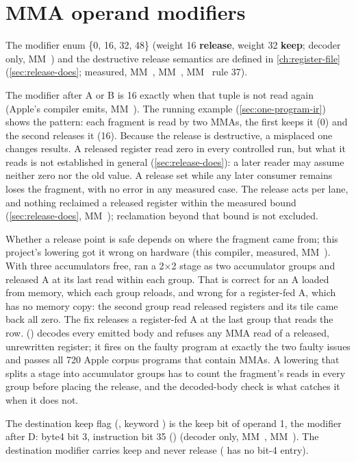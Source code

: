 \section{MMA operand modifiers}\label{sec:modifiers-keep-flag}

The modifier enum \{0, 16, 32, 48\} (weight 16 \textbf{release}, weight 32 \textbf{keep}; decoder only, MM~) and the destructive
release semantics are defined in \cref{ch:register-file} (\cref{sec:release-does}; measured, MM~, MM~, MM~ rule 37).

The modifier after A or B is 16 exactly when that tuple is not read again (Apple's compiler
emits, MM~). The running example (\cref{sec:one-program-ir}) shows the pattern: each fragment is read by two MMAs,
the first keeps it (0) and the second releases it (16). Because the release is destructive, a misplaced one changes
results. A released register read zero in every controlled run, but what it reads is not established in
general (\cref{sec:release-does}): a later reader may assume neither zero nor the old value. A release set while any later
consumer remains loses the fragment, with no error in any measured case. The release acts per lane, and nothing
reclaimed a released register within the measured bound (\cref{sec:release-does}, MM~); reclamation beyond that
bound is not excluded.

Whether a release point is safe depends on where the fragment came from; this project's lowering got it wrong on
hardware (this compiler, measured, MM~). With three accumulators free,  ran a 2×2 stage as two accumulator groups and released A
at its last read within each group. That is correct for an A loaded from memory, which each group reloads, and wrong
for a register-fed A, which has no memory copy: the second group read released registers and its tile came back all
zero. The fix releases a register-fed A at the last group that reads the row. 
() decodes every emitted body and refuses any MMA read of a released, unrewritten register; it fires on
the faulty program at exactly the two faulty issues and passes all 720 Apple corpus programs that contain MMAs. A
lowering that splits a stage into accumulator groups has to count the fragment's reads in every group before placing
the release, and the decoded-body check is what catches it when it does not.

The destination keep flag (,  keyword ) is the keep bit of operand 1, the modifier after
D: byte4 bit 3, instruction bit 35 () (decoder only, MM~, MM~). The
destination modifier carries keep and never release ( has no bit-4 entry).

